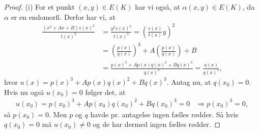 \begin{proof}
(i) For et punkt $(x, y) \in E(K)$ har vi også, at $\alpha(x, y) \in E(K)$, da $\alpha$ er en endomorfi. Derfor har vi, at
\begin{align*}
	\frac{(x^3 + Ax + B)s(x)^2}{t(x)^2} &= \frac{y^2 s(x)^2}{t(x)^2} = \left( \frac{s(x)}{t(x)}y \right)^2 \\
	&= \left( \frac{p(x)}{q(x)} \right)^3 + A \left( \frac{p(x)}{q(x)} \right) + B \\
	&= \frac{p(x)^3 + A p(x) q(x)^2 + B q(x)^3}{q(x)^3} = \frac{u(x)}{q(x)^3},
\end{align*}
hvor $u(x) = p(x)^3 + A p(x) q(x)^2 + B q(x)^3$. Antag nu, at $q(x_0)=0$. Hvis nu også $u(x_0)=0$ følger det, at
\begin{align*}
	u(x_0)=p(x_0)^3 + A p(x_0) q(x_0)^2 + B q(x_0)^3 = 0 &\Rightarrow p(x_0)^3 = 0,
\end{align*}
så $p(x_0) = 0$. Men $p$ og $q$ havde pr. antagelse ingen fælles rødder. Så hvis $q(x_0) = 0$ må $u(x_0) \neq 0$ og de har dermed ingen fælles rødder.


\end{proof}
